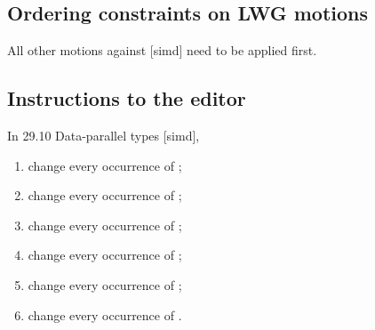 \subsection{Ordering constraints on LWG motions}

All other motions against [simd] need to be applied first.

\subsection{Instructions to the editor}

In 29.10 Data-parallel types [simd],

\begin{enumerate}
  \item change every occurrence of ;
  \item change every occurrence of ;
  \item change every occurrence of ;
  \item change every occurrence of ;
  \item change every occurrence of ;
  \item change every occurrence of .
\end{enumerate}


